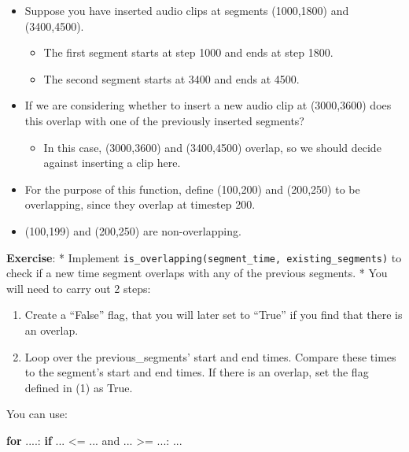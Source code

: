 \documentclass[11pt]{article}
\newenvironment{Shaded}{}{}
\newcommand{\KeywordTok}[1]{\textcolor[rgb]{0.00,0.44,0.13}{\textbf{{#1}}}}
\newcommand{\NormalTok}[1]{{#1}}
\begin{document}
\begin{itemize}
\itemsep1pt\parskip0pt
\item
  Suppose you have inserted audio clips at segments (1000,1800) and
  (3400,4500).

  \begin{itemize}
  \itemsep1pt\parskip0pt
  \item
    The first segment starts at step 1000 and ends at step 1800.
  \item
    The second segment starts at 3400 and ends at 4500.
  \end{itemize}
\item
  If we are considering whether to insert a new audio clip at
  (3000,3600) does this overlap with one of the previously inserted
  segments?

  \begin{itemize}
  \itemsep1pt\parskip0pt
  \item
    In this case, (3000,3600) and (3400,4500) overlap, so we should
    decide against inserting a clip here.
  \end{itemize}
\item
  For the purpose of this function, define (100,200) and (200,250) to be
  overlapping, since they overlap at timestep 200.
\item
  (100,199) and (200,250) are non-overlapping.
\end{itemize}

\textbf{Exercise}: * Implement
\texttt{is\_overlapping(segment\_time, existing\_segments)} to check if
a new time segment overlaps with any of the previous segments. * You
will need to carry out 2 steps:

\begin{enumerate}
\def\labelenumi{\arabic{enumi}.}
\itemsep1pt\parskip0pt
\item
  Create a ``False'' flag, that you will later set to ``True'' if you
  find that there is an overlap.
\item
  Loop over the previous\_segments' start and end times. Compare these
  times to the segment's start and end times. If there is an overlap,
  set the flag defined in (1) as True.
\end{enumerate}

You can use:

\begin{Shaded}
\begin{Highlighting}[]
\KeywordTok{for} \NormalTok{....:}
        \KeywordTok{if} \NormalTok{... <= ... and ... >= ...:}
            \NormalTok{...}
\end{Highlighting}
\end{Shaded}
\end{document}
